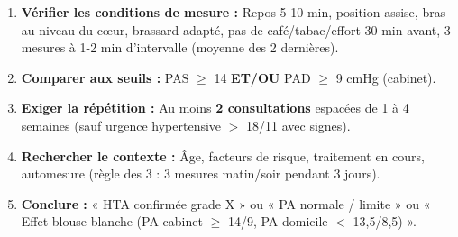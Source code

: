 \documentclass[11pt]{article}
\begin{document}
\begin{methode}
\begin{enumerate}
    \item \textbf{Vérifier les conditions de mesure :} Repos 5-10 min, position assise, bras au niveau du cœur, brassard adapté, pas de café/tabac/effort 30 min avant, 3 mesures à 1-2 min d'intervalle (moyenne des 2 dernières).
    \item \textbf{Comparer aux seuils :} PAS $\ge$ 14 \textbf{ET/OU} PAD $\ge$ 9 cmHg (cabinet).
    \item \textbf{Exiger la répétition :} Au moins \textbf{2 consultations} espacées de 1 à 4 semaines (sauf urgence hypertensive $>$ 18/11 avec signes).
    \item \textbf{Rechercher le contexte :} Âge, facteurs de risque, traitement en cours, automesure (règle des 3 : 3 mesures matin/soir pendant 3 jours).
    \item \textbf{Conclure :} « HTA confirmée grade X » ou « PA normale / limite » ou « Effet blouse blanche (PA cabinet $\ge$ 14/9, PA domicile $<$ 13,5/8,5) ».
\end{enumerate}
\end{methode}
\end{document}
